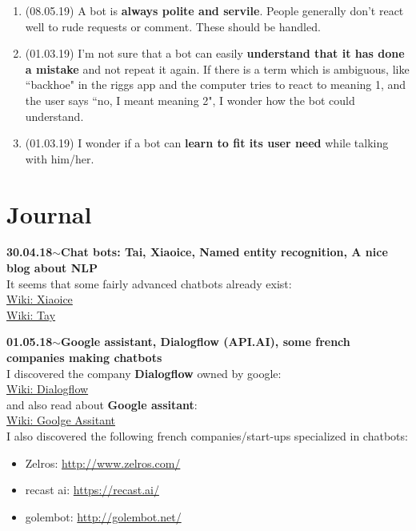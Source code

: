 \documentclass[11pt,a4paper]{article}
\newenvironment{loggentry}[2]%
{\noindent\textbf{#1}\hspace{1cm}$\mathbf{\sim}$\text{ }\textbf{#2}\\}{\vspace{0.5cm}}
\begin{document}
\begin{enumerate}
\item (08.05.19) A bot is \textbf{always polite and servile}. People generally don't react well to rude requests or comment. These should be handled.
\item (01.03.19) I'm not sure that a bot can easily \textbf{understand that it has done a mistake} and not repeat it again. If there is a term which is ambiguous, like ``backhoe" in the riggs app and the computer tries to react to meaning 1, and the user says ``no, I meant meaning 2", I wonder how the bot could understand.
\item (01.03.19) I wonder if a bot can \textbf{learn to fit its user need} while talking with him/her.
\end{enumerate}

\section{Journal}

\begin{loggentry}{30.04.18}{Chat bots: Tai, Xiaoice, Named entity recognition, A nice blog about NLP}
It seems that some fairly advanced chatbots already exist:\\
\href{https://en.wikipedia.org/wiki/Xiaoice}{Wiki: Xiaoice}\\
\href{https://en.wikipedia.org/wiki/Tay_(bot)}{Wiki: Tay}\\
\end{loggentry}

\begin{loggentry}{01.05.18}{Google assistant, Dialogflow (API.AI), some french companies making chatbots}
I discovered the company \textbf{Dialogflow} owned by google:\\
\href{https://en.wikipedia.org/wiki/Dialogflow}{Wiki: Dialogflow}\\
and also read about \textbf{Google assitant}:\\
\href{https://en.wikipedia.org/wiki/Google_Assistant}{Wiki: Goolge Assitant}\\
I also discovered the following french companies/start-ups specialized in chatbots:\\
\begin{itemize}
\item Zelros: \url{http://www.zelros.com/}
\item recast ai: \url{https://recast.ai/}
\item golembot: \url{http://golembot.net/}
\end{itemize}
\end{loggentry}
\end{document}

